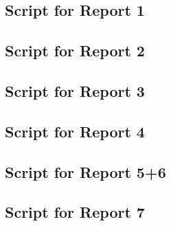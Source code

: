 	
	\subsection*{Script for Report 1} \label{matlab_1.1}
	
	\subsection*{Script for Report 2} \label{matlab_1.2}
	
	
	\subsection*{Script for Report 3} \label{matlab_2.1}
	
	\subsection*{Script for Report 4} \label{matlab_2.2}
	
	\subsection*{Script for Report 5+6} \label{matlab_2.3}
	
	\subsection*{Script for Report 7} \label{matlab_2.4}
	
	
